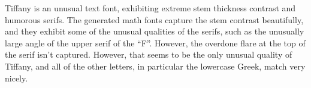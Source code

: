 
Tiffany is an unusual text font, exhibiting extreme stem thickness contrast and
humorous serifs. The generated math fonts capture the stem contrast beautifully,
and they exhibit some of the unusual qualities of the serifs, such as the
unusually large angle of the upper serif of the ``F''. However, the overdone
flare at the top of the serif isn't captured. However, that seems to be the only
unusual quality of Tiffany, and all of the other letters, in particular the
lowercase Greek, match very nicely.

